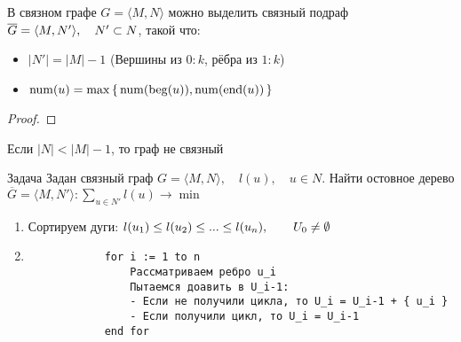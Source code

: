 \begin{theorem}
    В связном графе $ G = \langle M, N \rangle $ можно выделить связный подраф $ \overline{G} = \langle M, N' \rangle, \quad N' \subset N $, такой что:
    \begin{itemize}
    	\item $ |N'| = |M| - 1 $ (Вершины из $0 : k$, рёбра из $ 1 : k $)
        \item $ \operatorname{num}(u) = \max\set{\operatorname{num}(\operatorname{beg}(u)), \operatorname{num}(\operatorname{end}(u))} $
    \end{itemize}
\end{theorem}

\begin{proof}

\end{proof}

\begin{implication}
	Если $ |N| < |M| - 1 $, то граф не связный
\end{implication}

\begin{undefthm}{Задача}
    Задан связный граф $ G = \langle M, N \rangle, \quad l(u), \quad u \in N $. Найти остовное дерево $ \overline{G} = \langle M, N' \rangle : \sum_{u \in N'} l(u) \to \min $
\end{undefthm}

\begin{algorithm}[Краскалла]
	\hfill
    \begin{enumerate}
    	\item Сортируем дуги: $ l(u_1) \le l(u_2) \le ... \le l(u_n), \qquad U_0 \ne \emptyset $
        \item
        \begin{verbatim}
        	for i := 1 to n
                Рассматриваем ребро u_i
                Пытаемся доавить в U_i-1:
                - Если не получили цикла, то U_i = U_i-1 + { u_i }
                - Если получили цикл, то U_i = U_i-1
            end for
        \end{verbatim}

    \end{enumerate}

\end{algorithm}
